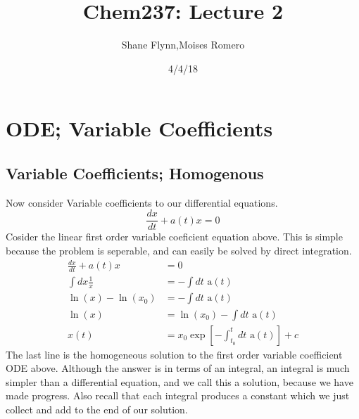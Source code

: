 \documentclass{article}
\title{Chem237: Lecture 2}
\date{4/4/18}
\author{Shane Flynn,Moises Romero}
\newcommand{\be}{\begin{equation}}
\newcommand{\ee}{\end{equation}}
\begin{document}
\maketitle
\section*{ODE; Variable Coefficients}
\subsection*{Variable Coefficients; Homogenous}
Now consider Variable coefficients to our differential equations.
\be
\frac{dx}{dt} + a(t) x = 0
\ee
Cosider the linear first order variable coeficient equation above.
This is simple because the problem is seperable, and can easily be solved by direct integration.
\be
\begin{split}
    \frac{dx}{dt} + a(t) x &= 0 \\
    \int dx \frac{1}{x} &= -\int dt \text{ a}(t) \\
    \ln(x) -\ln(x_0)  &= -\int dt \text{ a}(t) \\
    \ln(x)  &= \ln(x_0) -\int dt \text{ a}(t) \\
    x(t) &= x_0 \exp\left[-\int_{t_0}^t dt \text{ a}(t)\right] + c
\end{split}
\ee
The last line is the homogeneous solution to the first order variable coefficient ODE above.
Although the answer is in terms of an integral, an integral is much simpler than a differential equation, and we call this a solution, because we have made progress. Also recall that each integral produces a constant which we just collect and add to the end of our solution.
\end{document}
